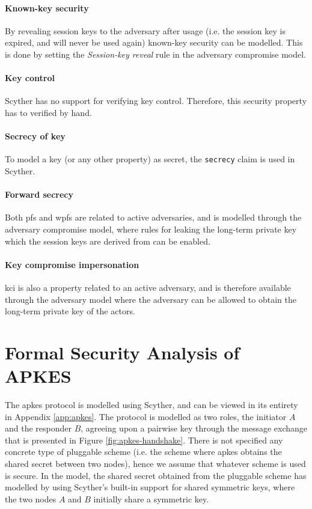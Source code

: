 \paragraph{Known-key security} By revealing session keys to the adversary after usage (i.e. the session key is expired, and will never be used again) known-key security can be modelled. This is done by setting the \emph{Session-key reveal} rule in the adversary compromise model.

\paragraph{Key control} Scyther has no support for verifying key control. Therefore, this security property has to verified by hand. 

\paragraph{Secrecy of key} To model a key (or any other property) as secret, the \texttt{secrecy} claim is used in Scyther.

\paragraph{Forward secrecy} Both \gls{pfs} and \gls{wpfs} are related to active adversaries, and is modelled through the adversary compromise model, where rules for leaking the long-term private key which the session keys are derived from can be enabled.

\paragraph{Key compromise impersonation} \gls{kci} is also a property related to an active adversary, and is therefore available through the adversary model where the adversary can be allowed to obtain the long-term private key of the actors.


\section{Formal Security Analysis of APKES}

The \gls{apkes} protocol is modelled using Scyther, and can be viewed in its entirety in Appendix \ref{app:apkes}. The protocol is modelled as two roles, the initiator $A$ and the responder $B$, agreeing upon a pairwise key through the message exchange that is presented in Figure \ref{fig:apkes-handshake}. There is not specified any concrete type of pluggable scheme (i.e. the scheme where \gls{apkes} obtains the shared secret between two nodes), hence we assume that whatever scheme is used is secure. In the model, the shared secret obtained from the pluggable scheme has modelled by using Scyther's built-in support for shared symmetric keys, where the two nodes $A$ and $B$ initially share a symmetric key.

